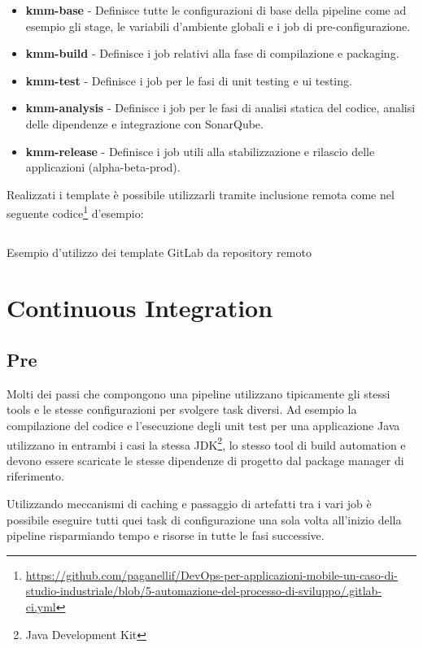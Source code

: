 \begin{itemize}
    \item \textbf{kmm-base} - Definisce tutte le configurazioni di base della pipeline come ad esempio gli stage, le variabili d'ambiente globali e i job di pre-configurazione.
    \item \textbf{kmm-build} - Definisce i job relativi alla fase di compilazione e packaging.
    \item \textbf{kmm-test} - Definisce i job per le fasi di unit testing e ui testing.
    \item \textbf{kmm-analysis} - Definisce i job per le fasi di analisi statica del codice, analisi delle dipendenze e integrazione con SonarQube.
    \item \textbf{kmm-release} - Definisce i job utili alla stabilizzazione e rilascio delle applicazioni (alpha-beta-prod).
\end{itemize}

Realizzati i template è possibile utilizzarli tramite inclusione remota come nel seguente codice\footnote{\href{https://github.com/paganellif/DevOps-per-applicazioni-mobile-un-caso-di-studio-industriale/blob/5-automazione-del-processo-di-sviluppo/.gitlab-ci.yml}{https://github.com/paganellif/DevOps-per-applicazioni-mobile-un-caso-di-studio-industriale/blob/5-automazione-del-processo-di-sviluppo/.gitlab-ci.yml}} d'esempio:

\begin{listing}[H]
    \inputminted{yaml}{code/template-usage.yaml}
    \caption{Esempio d'utilizzo dei template GitLab da repository remoto}
\end{listing}

\section{Continuous Integration}
\subsection{Pre}
Molti dei passi che compongono una pipeline utilizzano tipicamente gli stessi tools e le stesse configurazioni per svolgere task diversi. Ad esempio la compilazione del codice e l'esecuzione degli unit test per una applicazione Java utilizzano in entrambi i casi la stessa JDK\footnote{Java Development Kit}, lo stesso tool di build automation e devono essere scaricate le stesse dipendenze di progetto dal package manager di riferimento.

Utilizzando meccanismi di caching e passaggio di artefatti tra i vari job è possibile eseguire tutti quei task di configurazione una sola volta all'inizio della pipeline risparmiando tempo e risorse in tutte le fasi successive.


